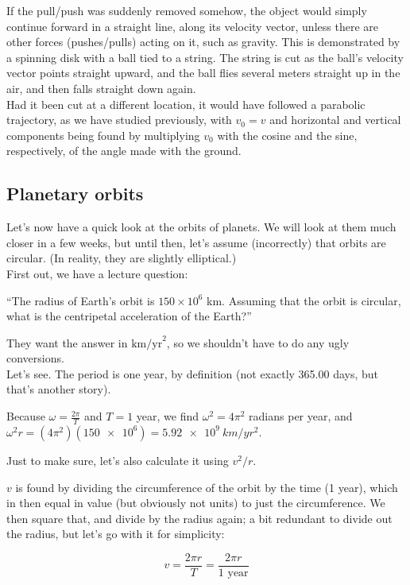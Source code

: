 \documentclass[8.01x]{subfiles}
\begin{document}
If the pull/push was suddenly removed somehow, the object would simply continue forward in a straight line, along its velocity vector, unless there are other forces (pushes/pulls) acting on it, such as gravity. This is demonstrated by a spinning disk with a ball tied to a string. The string is cut as the ball's velocity vector points straight upward, and the ball flies several meters straight up in the air, and then falls straight down again.\\
Had it been cut at a different location, it would have followed a parabolic trajectory, as we have studied previously, with $v_0 = v$ and horizontal and vertical components being found by multiplying $v_0$ with the cosine and the sine, respectively, of the angle made with the ground.

\subsection{Planetary orbits}

Let's now have a quick look at the orbits of planets. We will look at them much closer in a few weeks, but until then, let's assume (incorrectly) that orbits are circular. (In reality, they are slightly elliptical.)\\
First out, we have a lecture question:

``The radius of Earth's orbit is $150 \times 10^6$ km. Assuming that the orbit is circular, what is the centripetal acceleration of the Earth?''

They want the answer in $\text{km/yr}^2$, so we shouldn't have to do any ugly conversions.\\
Let's see. The period is one year, by definition (not exactly 365.00 days, but that's another story).

Because $\omega = \frac{2\pi}{T}$ and $T = 1$ year, we find $\omega^2 = 4\pi^2$ radians per year, and $\omega^2 r = (4 \pi^2)(\num{150e6}) = \SI{5.92e9}{km/yr^2}$.

Just to make sure, let's also calculate it using $v^2/r$.

$v$ is found by dividing the circumference of the orbit by the time (1 year), which in then equal in value (but obviously not units) to just the circumference. We then square that, and divide by the radius again; a bit redundant to divide out the radius, but let's go with it for simplicity:

\begin{equation}
v = \frac{2 \pi r}{T} = \frac{2 \pi r}{1 \text{ year}}
\end{equation}
\end{document}
